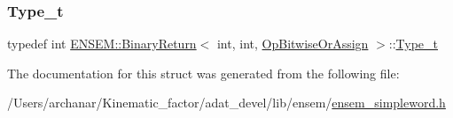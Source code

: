 \mbox{\label{structENSEM_1_1BinaryReturn_3_01int_00_01int_00_01OpBitwiseOrAssign_01_4_a39b11e165103fedd3dd7ec8e4ef89d93}} 
\subsubsection{\texorpdfstring{Type\_t}{Type\_t}\hspace{0.1cm}{\footnotesize\ttfamily [2/2]}}
{\footnotesize\ttfamily typedef int \mbox{\hyperlink{structENSEM_1_1BinaryReturn}{E\+N\+S\+E\+M\+::\+Binary\+Return}}$<$ int, int, \mbox{\hyperlink{structENSEM_1_1OpBitwiseOrAssign}{Op\+Bitwise\+Or\+Assign}} $>$\+::\mbox{\hyperlink{structENSEM_1_1BinaryReturn_3_01int_00_01int_00_01OpBitwiseOrAssign_01_4_a39b11e165103fedd3dd7ec8e4ef89d93}{Type\+\_\+t}}}



The documentation for this struct was generated from the following file\+:\begin{DoxyCompactItemize}
\item 
/\+Users/archanar/\+Kinematic\+\_\+factor/adat\+\_\+devel/lib/ensem/\mbox{\hyperlink{lib_2ensem_2ensem__simpleword_8h}{ensem\+\_\+simpleword.\+h}}\end{DoxyCompactItemize}
